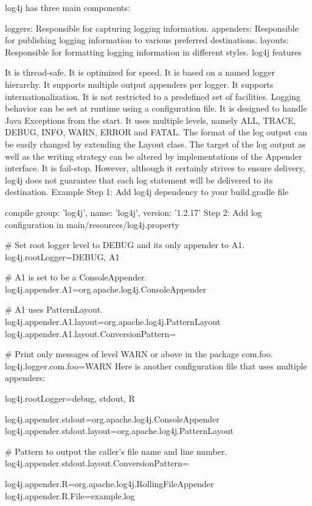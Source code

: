 log4j has three main components:

loggers: Responsible for capturing logging information.
appenders: Responsible for publishing logging information to various preferred destinations.
layouts: Responsible for formatting logging information in different styles.
log4j features

It is thread-safe.
It is optimized for speed.
It is based on a named logger hierarchy.
It supports multiple output appenders per logger.
It supports internationalization.
It is not restricted to a predefined set of facilities.
Logging behavior can be set at runtime using a configuration file.
It is designed to handle Java Exceptions from the start.
It uses multiple levels, namely ALL, TRACE, DEBUG, INFO, WARN, ERROR and FATAL.
The format of the log output can be easily changed by extending the Layout class.
The target of the log output as well as the writing strategy can be altered by implementations of the Appender interface.
It is fail-stop. However, although it certainly strives to ensure delivery, log4j does not guarantee that each log statement will be delivered to its destination.
Example
Step 1: Add log4j dependency to your build.gradle file

compile group: 'log4j', name: 'log4j', version: '1.2.17'
Step 2: Add log configuration in main/resources/log4j.property

# Set root logger level to DEBUG and its only appender to A1.
log4j.rootLogger=DEBUG, A1

# A1 is set to be a ConsoleAppender.
log4j.appender.A1=org.apache.log4j.ConsoleAppender

# A1 uses PatternLayout.
log4j.appender.A1.layout=org.apache.log4j.PatternLayout
log4j.appender.A1.layout.ConversionPattern=%

# Print only messages of level WARN or above in the package com.foo.
log4j.logger.com.foo=WARN
Here is another configuration file that uses multiple appenders:

log4j.rootLogger=debug, stdout, R

log4j.appender.stdout=org.apache.log4j.ConsoleAppender
log4j.appender.stdout.layout=org.apache.log4j.PatternLayout

# Pattern to output the caller's file name and line number.
log4j.appender.stdout.layout.ConversionPattern=%

log4j.appender.R=org.apache.log4j.RollingFileAppender
log4j.appender.R.File=example.log

